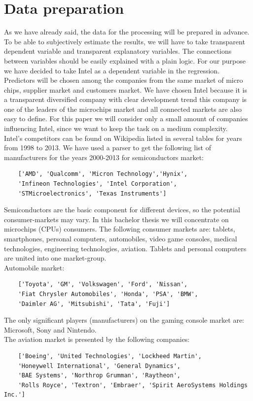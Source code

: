 \documentclass[
  twoside,
  11pt, a4paper,
  footinclude=true,
  headinclude=true,
  cleardoublepage=empty
]{scrreprt}
\begin{document}
    \section{Data preparation}
    As we have already said, the data for the processing will be prepared in advance. To be able to subjectively estimate the results, we will have to take transparent dependent variable and transparent explanatory variables. The connections between variables should be easily explained with a plain logic. For our purpose we have decided to take Intel as a dependent variable in the regression. Predictors will be chosen among the companies from the same market of micro chips, supplier market and customers market. We have chosen Intel because it is a transparent diversified company with clear development trend this company is one of the leaders of the microchips market and all connected markets are also easy to define. For this paper we will consider only a small amount of companies influencing Intel, since we want to keep the task on a medium complexity.\\
    Intel's competitors can be found on Wikipedia listed in several tables for years from 1998 to 2013. We have used a parser to get the following list of manufacturers for the years 2000-2013 for semiconductors market:
    \begin{verbatim}
    ['AMD', 'Qualcomm', 'Micron Technology','Hynix',
    'Infineon Technologies', 'Intel Corporation', 
    'STMicroelectronics', 'Texas Instruments']
    \end{verbatim}
    Semiconductors are the basic component for different devices, so the potential consumer-markets may vary. In this bachelor thesis we will concentrate on microchips (CPUs) consumers. The following consumer markets are: tablets, smartphones, personal computers, automobiles, video game consoles, medical technologies, engineering technologies, aviation. Tablets and personal computers are united into one market-group.\\
    Automobile market:
    \begin{verbatim}
    ['Toyota', 'GM', 'Volkswagen', 'Ford', 'Nissan', 
    'Fiat Chrysler Automobiles', 'Honda', 'PSA', 'BMW',
    'Daimler AG', 'Mitsubishi', 'Tata', 'Fuji']
    \end{verbatim}
    The only significant players (manufacturers) on the gaming console market are: Microsoft, Sony and Nintendo.\\ 
    The aviation market is presented by the following companies: 
    \begin{verbatim}
    ['Boeing', 'United Technologies', 'Lockheed Martin',
    'Honeywell International', 'General Dynamics',
    'BAE Systems', 'Northrop Grumman', 'Raytheon',
    'Rolls Royce', 'Textron', 'Embraer', 'Spirit AeroSystems Holdings Inc.']
    \end{verbatim}
\end{document}

